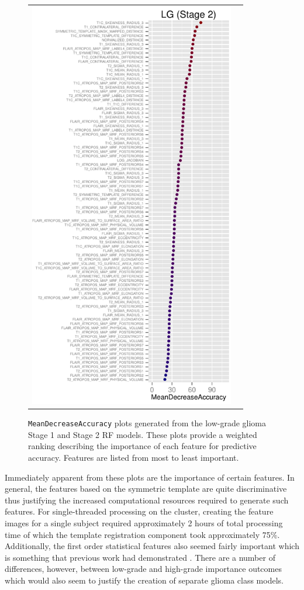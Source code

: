 \documentclass[preprint,authoryear,review,12pt]{elsarticle}
\begin{document}
{\begin{figure}
{\begin{tabular}{cc}
  \includegraphics[width=90mm]{Figures/BRATS_LG_MAP_MRF.pdf} \\
  \end{tabular}
  }
  \caption{{\tt MeanDecreaseAccuracy} plots generated from the low-grade glioma
  Stage 1 and Stage 2 RF models.  These plots provide a weighted 
  ranking describing the importance of each feature for predictive accuracy.
  Features are listed from most to least important.
  }
  \label{fig:lgimportance}
\end{figure}

Immediately apparent from these plots are the importance of certain features.
In general, the features based on the symmetric template are quite
discriminative thus justifying the increased computational 
resources required to generate such features.  For single-threaded processing
on the cluster, creating the feature images for a single subject required 
approximately 2 hours of total processing time of which the template registration 
component took approximately 75\%.  Additionally, the first order 
statistical features also seemed fairly important which is something that
previous work had demonstrated \citep[e.g.,][]{bauer2012,zikic2012}.
There are a number of differences, however, between low-grade and high-grade 
importance outcomes which would also seem to justify the creation of separate
glioma class models.

}
\end{document}
